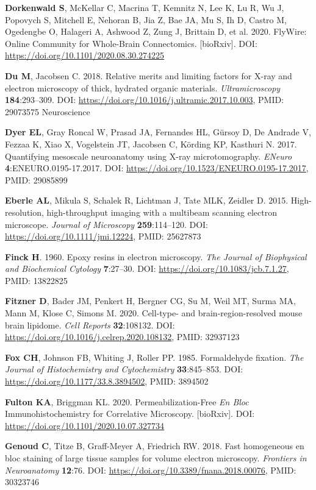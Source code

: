 \documentclass{article}
\newenvironment{reflist}{\par\small\setlength{\parindent}{0pt}\everypar{\hangindent=2.2em\hangafter=1}}{\par}
\begin{document}
\begin{reflist}
\textbf{Dorkenwald S}, McKellar C, Macrina T, Kemnitz N, Lee K, Lu R, Wu J, Popovych S, Mitchell E, Nehoran B, Jia Z, Bae JA, Mu S, Ih D, Castro M, Ogedengbe O, Halageri A, Ashwood Z, Zung J, Brittain D, et al. 2020. FlyWire: Online Community for Whole-Brain Connectomics. [bioRxiv]. DOI: \url{https://doi.org/10.1101/2020.08.30.274225}

\textbf{Du M}, Jacobsen C. 2018. Relative merits and limiting factors for X-ray and electron microscopy of thick, hydrated organic materials. \emph{Ultramicroscopy} \textbf{184}:293–309. DOI: \url{https://doi.org/10.1016/j.ultramic.2017.10.003}, PMID: 29073575 Neuroscience

\textbf{Dyer EL}, Gray Roncal W, Prasad JA, Fernandes HL, Gürsoy D, De Andrade V, Fezzaa K, Xiao X, Vogelstein JT, Jacobsen C, Körding KP, Kasthuri N. 2017. Quantifying mesoscale neuroanatomy using X-ray microtomography. \emph{ENeuro} \textbf{4}:ENEURO.0195-17.2017. DOI: \url{https://doi.org/10.1523/ENEURO.0195-17.2017}, PMID: 29085899

\textbf{Eberle AL}, Mikula S, Schalek R, Lichtman J, Tate MLK, Zeidler D. 2015. High-resolution, high-throughput imaging with a multibeam scanning electron microscope. \emph{Journal of Microscopy} \textbf{259}:114–120. DOI: \url{https://doi.org/10.1111/jmi.12224}, PMID: 25627873

\textbf{Finck H}. 1960. Epoxy resins in electron microscopy. \emph{The Journal of Biophysical and Biochemical Cytology} \textbf{7}:27–30. DOI: \url{https://doi.org/10.1083/jcb.7.1.27}, PMID: 13822825

\textbf{Fitzner D}, Bader JM, Penkert H, Bergner CG, Su M, Weil MT, Surma MA, Mann M, Klose C, Simons M. 2020. Cell-type- and brain-region-resolved mouse brain lipidome. \emph{Cell Reports} \textbf{32}:108132. DOI: \url{https://doi.org/10.1016/j.celrep.2020.108132}, PMID: 32937123

\textbf{Fox CH}, Johnson FB, Whiting J, Roller PP. 1985. Formaldehyde fixation. \emph{The Journal of Histochemistry and Cytochemistry} \textbf{33}:845–853. DOI: \url{https://doi.org/10.1177/33.8.3894502}, PMID: 3894502

\textbf{Fulton KA}, Briggman KL. 2020. Permeabilization-Free \emph{En Bloc} Immunohistochemistry for Correlative Microscopy. [bioRxiv]. DOI: \url{https://doi.org/10.1101/2020.10.07.327734}

\textbf{Genoud C}, Titze B, Graff-Meyer A, Friedrich RW. 2018. Fast homogeneous en bloc staining of large tissue samples for volume electron microscopy. \emph{Frontiers in Neuroanatomy} \textbf{12}:76. DOI: \url{https://doi.org/10.3389/fnana.2018.00076}, PMID: 30323746


\end{reflist}
\end{document}
